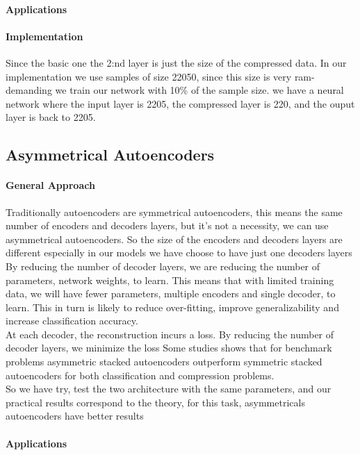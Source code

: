 \documentclass[11pt]{article}
\begin{document}
\paragraph{Applications}
\paragraph{Implementation}
Since the basic one
the 2:nd layer is just the size of the compressed data.
In our implementation we use samples of size 22050, since this size is very ram-demanding we train our network with 10\% of the sample size.
we have a neural network where the input layer is 2205, the compressed layer is 220, and the ouput layer is back to 2205.


\subsection{Asymmetrical Autoencoders}

\paragraph{General Approach}

Traditionally autoencoders are symmetrical autoencoders, this means the same number of encoders and decoders layers, but it’s not a necessity, we can use asymmetrical autoencoders.
So the size of the encoders and decoders layers are different especially in our models we have choose to have just one decoders layers\\
By reducing the number of decoder layers, we are reducing the number of parameters, network weights, to learn. This means that with limited training data, we will have fewer parameters, multiple encoders and single decoder, to learn. This in turn is likely to reduce over-fitting, improve generalizability and increase classification accuracy. \\
At each decoder, the reconstruction incurs a loss. By reducing the number of decoder layers, we minimize the loss
Some studies shows that for benchmark problems asymmetric stacked autoencoders outperform symmetric stacked autoencoders for both classification and compression problems. \\
So we have try, test the two architecture with the same parameters, and our practical results correspond to the theory, for this task, asymmetricals autoencoders have better results
  
\paragraph{Applications} 
\end{document}
